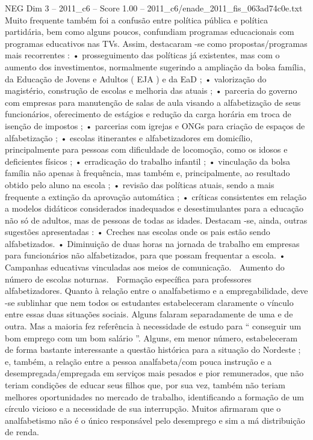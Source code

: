 \begin{textsample}{NEG Dim 3 – 2011\_c6 – Score 1.00 – 2011\_c6/enade\_2011\_fis\_063ad74c0e.txt}
Muito frequente também foi a confusão entre política pública e política partidária, bem como alguns poucos, confundiam programas educacionais com programas educativos nas TVs.
Assim, destacaram -se como propostas/programas mais recorrentes : • prosseguimento das políticas já existentes, mas com o aumento dos investimentos, normalmente sugerindo a ampliação da bolsa família, da Educação de Jovens e Adultos ( EJA ) e da EaD ; • valorização do magistério, construção de escolas e melhoria das atuais ; • parceria do governo com empresas para manutenção de salas de aula visando a alfabetização de seus funcionários, oferecimento de estágios e redução da carga horária em troca de isenção de impostos ; • parcerias com igrejas e ONGs para criação de espaços de alfabetização ; • escolas itinerantes e alfabetizadores em domicílio, principalmente para pessoas com dificuldade de locomoção, como os idosos e deficientes físicos ; • erradicação do trabalho infantil ; • vinculação da bolsa família não apenas à frequência, mas também e, principalmente, ao resultado obtido pelo aluno na escola ; • revisão das políticas atuais, sendo a mais frequente a extinção da aprovação automática ; • críticas consistentes em relação a modelos didáticos considerados inadequados e desestimulantes para a educação não só de adultos, mas de pessoas de todas as idades.
Destacam -se, ainda, outras sugestões apresentadas : • Creches nas escolas onde os pais estão sendo alfabetizados. • Diminuição de duas horas na jornada de trabalho em empresas para funcionários não alfabetizados, para que possam frequentar a escola. • Campanhas educativas vinculadas aos meios de comunicação.  Aumento do número de escolas noturnas.  Formação específica para professores alfabetizadores.
Quanto à relação entre o analfabetismo e a empregabilidade, deve -se sublinhar que nem todos os estudantes estabeleceram claramente o vínculo entre essas duas situações sociais.
Alguns falaram separadamente de uma e de outra.
Mas a maioria fez referência à necessidade de estudo para “ conseguir um bom emprego com um bom salário ”.
Alguns, em menor número, estabeleceram de forma bastante interessante a questão histórica para a situação do Nordeste ; e, também, a relação entre a pessoa analfabeta/com pouca instrução e a desempregada/empregada em serviços mais pesados e pior remunerados, que não teriam condições de educar seus filhos que, por sua vez, também não teriam melhores oportunidades no mercado de trabalho, identificando a formação de um círculo vicioso e a necessidade de sua interrupção.
Muitos afirmaram que o analfabetismo não é o único responsável pelo desemprego e sim a má distribuição de renda.

\end{textsample}
